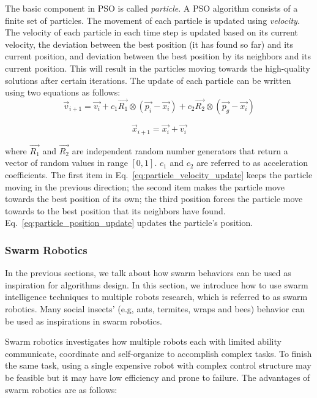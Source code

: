 The basic component in PSO is called \textit{particle}. A PSO algorithm consists of a finite set of particles. The movement of each particle is updated using \textit{velocity}. The velocity of each particle in each time step is updated based on its current velocity, the deviation between the best position (it has found so far) and its current position, and deviation between the best position by its neighbors and its current position. This will result in the particles moving towards the high-quality solutions after certain iterations. The update of each particle can be written using two equations as follows:
\begin{equation}\label{eq:particle_velocity_update}
\overrightarrow{v}_{i+1} =  \overrightarrow{v_{i}} + c_1\overrightarrow{R_{1}}\otimes(\overrightarrow{p_{i}} - \overrightarrow{x_{i}}) + c_2\overrightarrow{R_{2}}\otimes(\overrightarrow{p_{g}} - \overrightarrow{x_{i}}) 
\end{equation} 

\begin{equation}\label{eq:particle_position_update}
\overrightarrow{x}_{i+1} =  \overrightarrow{x_{i}} + \overrightarrow{v_{i}}
\end{equation} 

where $\overrightarrow{R_{1}}$ and $\overrightarrow{R_{2}}$ are independent random number generators that return a vector of random values in range $[0, 1]$. $c_1$ and $c_2$ are referred to as acceleration coefficients. The first item in Eq.~\eqref{eq:particle_velocity_update} keeps the particle moving in the previous direction; the second item makes the particle move towards the best position of its own; the third position forces the particle move towards to the best position that its neighbors have found. Eq.~\eqref{eq:particle_position_update} updates the particle's position.  

\subsubsection{Swarm Robotics}

In the previous sections, we talk about how swarm behaviors can be used as inspiration for algorithms design. In this section, we introduce how to use swarm intelligence techniques to multiple robots research, which is referred to as swarm robotics. Many social insects' (e.g, ants, termites, wraps and bees) behavior can be used as inspirations in swarm robotics. 

Swarm robotics investigates how multiple robots each with limited ability communicate, coordinate and self-organize to accomplish complex tasks. To finish the same task, using a single expensive robot with complex control structure may be feasible but it may have low efficiency and prone to failure. The advantages of swarm robotics are as follows: 

